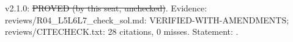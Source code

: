 \begin{proposition}\label{reg:W2-FAC-A_Prop-F-FAC}
\end{proposition}
\begin{statusbox}
 v2.1.0: \st{PROVED (by this seat, unchecked)}. Evidence: reviews/R04\_L5L6L7\_check\_sol.md: VERIFIED-WITH-AMENDMENTS; reviews/CITECHECK.txt: 28 citations, 0 misses. Statement: .
\end{statusbox}
